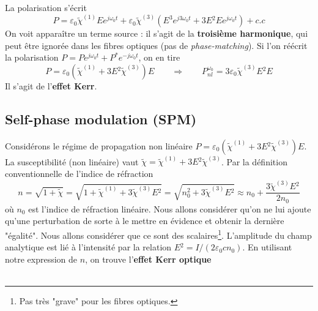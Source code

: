 La polarisation s'écrit
\begin{equation}
P = {\varepsilon _0}{\tilde \chi ^{(1)}}E{e^{j{\omega _0}t}} + {\varepsilon _0}{\tilde \chi ^{(3)}}({E^3}{e^{j3{\omega _0}t}} + 3E{^2}E{e^{j{\omega _0}t}}) + c.c
\end{equation}
On voit apparaître un terme source : il s'agit de la \textbf{troisième harmonique}, qui peut être
ignorée dans les fibres optiques (pas de \textit{phase-matching}). Si l'on réécrit la polarisation 
$P = P{e^{j{\omega _0}t}} + {P^*}{e^{ - j{\omega _0}t}}$, on en tire
\begin{equation}
P = {\varepsilon _0}({\tilde \chi ^{(1)}} + 3E{^2}{\tilde \chi ^{(3)}})E
\qquad\Rightarrow\qquad
 P_{nl}^{{\omega _0}} = 3{\varepsilon _0}{\tilde \chi ^{(3)}}E{^2}E
\end{equation}
Il s'agit de l'\textbf{effet Kerr}.

\subsection{Self-phase modulation (SPM)}
Considérons le régime de propagation non linéaire $P = {\varepsilon _0}({\tilde \chi ^{(1)}} + 3E{^2}
{\tilde \chi ^{(3)}})E$. La susceptibilité (non linéaire) vaut $\tilde \chi  = {\tilde \chi ^{(1)}} +
 3E{^2}{\tilde \chi ^{(3)}}$. Par la définition conventionnelle de l'indice de réfraction
\begin{equation}
n = \sqrt {1 + \tilde \chi }  = \sqrt {1 + {{\tilde \chi }^{(1)}} + 3{{\tilde \chi }^{(3)}}E{^2}}  = \sqrt {n_0^2 + 3{{\tilde \chi }^{(3)}}E{^2}}  \approx {n_0} + \frac{{3{{\tilde \chi }^{(3)}}E{^2}}}{{2{n_0}}}
\end{equation}
où $n_0$ est l'indice de réfraction linéaire. Nous allons considérer qu'on ne lui ajoute qu'une
perturbation de sorte à le mettre en évidence et obtenir la dernière "égalité". Nous allons 
considérer que ce sont des scalaires\footnote{Pas très "grave" pour les fibres optiques.}. 
L'amplitude du champ analytique est lié à l'intensité par la relation $E{^2} = I/(2{\varepsilon _0}
c{n_0})$. En utilisant notre expression de $n$, on trouve l'\textbf{effet Kerr optique}\\

\ \\

